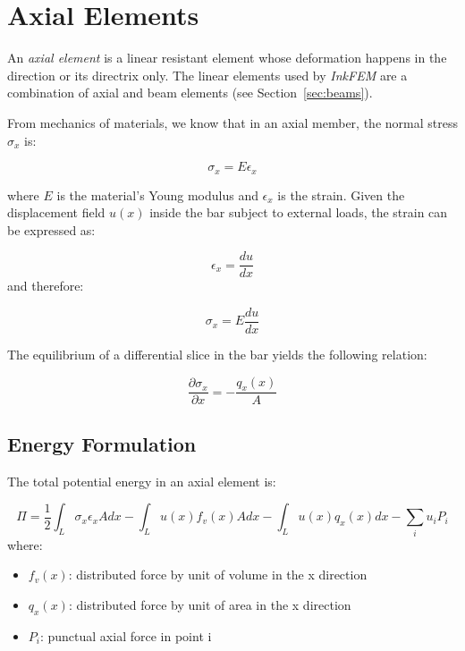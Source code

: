 \section{Axial Elements}
\label{sec:axial}

An \emph{axial element} is a linear resistant element whose deformation happens in the direction or its directrix only.
The linear elements used by \emph{InkFEM} are a combination of axial and beam elements (see Section~\ref{sec:beams}).

From mechanics of materials, we know that in an axial member, the normal stress $\sigma_x$ is:

\begin{equation}
  \sigma_x = E \epsilon_x
\end{equation}

where $E$ is the material's Young modulus and $\epsilon_x$ is the strain.
Given the displacement field $u(x)$ inside the bar subject to external loads, the strain can be expressed as:

\begin{equation}
  \epsilon_x = \frac{du}{dx}  
\end{equation}
and therefore:

\[
  \sigma_x = E \frac{du}{dx}
\]

The equilibrium of a differential slice in the bar yields the following relation:

\begin{equation}
  \frac{\partial \sigma_x}{\partial x} = - \frac{q_x(x)}{A}  
\end{equation}


\subsection{Energy Formulation}

The total potential energy in an axial element is:

\begin{equation}
  \Pi = \frac{1}{2} \int_L \sigma_x \epsilon_x A dx 
  - \int_L u(x) f_v(x) A dx 
  - \int_L u(x) q_x(x) dx 
  - \sum_i u_i P_i
\end{equation}
where:

\begin{itemize}
  \item $f_v(x)$: distributed force by unit of volume in the x direction
  \item $q_x(x)$: distributed force by unit of area in the x direction
  \item $P_i$: punctual axial force in point i
\end{itemize}


